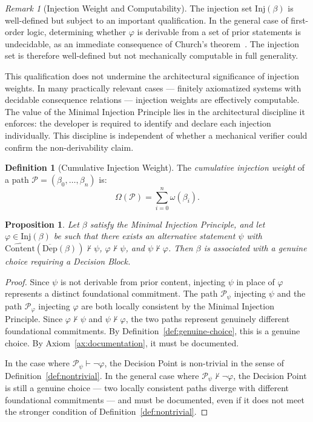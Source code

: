 \documentclass[12pt, a4paper]{article}
\theoremstyle{plain}
\newtheorem{proposition}[theorem]{Proposition}
\theoremstyle{definition}
\newtheorem{definition}[theorem]{Definition}
\theoremstyle{remark}
\newtheorem{remark}[theorem]{Remark}
\newcommand{\Inj}[1]{\mathrm{Inj}(#1)}
\newcommand{\IW}[1]{\omega(#1)}
\newcommand{\CIW}[1]{\Omega(#1)}
\newcommand{\DC}[1]{\overline{\mathrm{Dep}}(#1)}
\newcommand{\CC}[1]{\widehat{\mathrm{Content}}(#1)}
\begin{document}
\begin{remark}[Injection Weight and Computability]
\label{rem:computability}
The injection set $\Inj{\beta}$ is well-defined but subject to
an important qualification. In the general case of first-order
logic, determining whether $\varphi$ is derivable from a set of
prior statements is undecidable, as an immediate consequence of
Church's theorem~\cite{Church1936}. The injection set is
therefore well-defined but not mechanically computable in full
generality.

This qualification does not undermine the architectural
significance of injection weights. In many practically relevant
cases --- finitely axiomatized systems with decidable consequence
relations --- injection weights are effectively computable. The
value of the Minimal Injection Principle lies in the
architectural discipline it enforces: the developer is required
to identify and declare each injection individually. This
discipline is independent of whether a mechanical verifier could
confirm the non-derivability claim.
\end{remark}

\begin{definition}[Cumulative Injection Weight]
\label{def:cumulative-weight}
The \emph{cumulative injection weight} of a path
$\mathcal{P} = (\beta_0,\ldots,\beta_n)$ is:
\[
  \CIW{\mathcal{P}} = \sum_{i=0}^{n} \IW{\beta_i}.
\]
\end{definition}

\begin{proposition}
\label{prop:minimal-injection-dp}
Let $\beta$ satisfy the Minimal Injection Principle, and let
$\varphi \in \Inj{\beta}$ be such that there exists an
alternative statement $\psi$ with
$\CC{\DC{\beta}} \nvdash \psi$,
$\varphi \nvdash \psi$, and $\psi \nvdash \varphi$.
Then $\beta$ is associated with a genuine choice requiring a
Decision Block.
\end{proposition}

\begin{proof}
Since $\psi$ is not derivable from prior content, injecting
$\psi$ in place of $\varphi$ represents a distinct foundational
commitment. The path $\mathcal{P}_\psi$ injecting $\psi$ and the
path $\mathcal{P}_\varphi$ injecting $\varphi$ are both locally
consistent by the Minimal Injection Principle. Since
$\varphi \nvdash \psi$ and $\psi \nvdash \varphi$, the two paths
represent genuinely different foundational commitments. By
Definition~\ref{def:genuine-choice}, this is a genuine choice.
By Axiom~\ref{ax:documentation}, it must be documented.

In the case where $\mathcal{P}_\psi \vdash \neg\varphi$, the
Decision Point is non-trivial in the sense of
Definition~\ref{def:nontrivial}. In the general case where
$\mathcal{P}_\psi \nvdash \neg\varphi$, the Decision Point is
still a genuine choice --- two locally consistent paths diverge
with different foundational commitments --- and must be
documented, even if it does not meet the stronger condition of
Definition~\ref{def:nontrivial}.
\end{proof}
\end{document}
